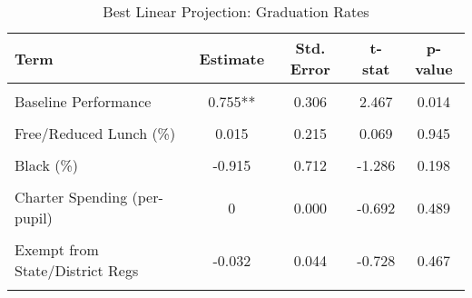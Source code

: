 \begin{table}[!h]
\centering
\caption{\label{tab:blp_afgr}Best Linear Projection: Graduation Rates}
\centering
\begin{tabular}[t]{lcccc}
\toprule
Term & Estimate & Std. Error & t-stat & p-value\\
\midrule
\cellcolor{gray!10}{(Intercept)} & \cellcolor{gray!10}{-1.601**} & \cellcolor{gray!10}{0.642} & \cellcolor{gray!10}{-2.496} & \cellcolor{gray!10}{0.013}\\
Baseline Performance & 0.755** & 0.306 & 2.467 & 0.014\\
\cellcolor{gray!10}{White (\%)} & \cellcolor{gray!10}{-0.245} & \cellcolor{gray!10}{0.314} & \cellcolor{gray!10}{-0.780} & \cellcolor{gray!10}{0.436}\\
Free/Reduced Lunch (\%) & 0.015 & 0.215 & 0.069 & 0.945\\
\cellcolor{gray!10}{TPS-Charter Spending (\% diff)} & \cellcolor{gray!10}{0.099} & \cellcolor{gray!10}{0.356} & \cellcolor{gray!10}{0.279} & \cellcolor{gray!10}{0.781}\\
Black (\%) & -0.915 & 0.712 & -1.286 & 0.198\\
\cellcolor{gray!10}{Special Ed (\%)} & \cellcolor{gray!10}{3.521*} & \cellcolor{gray!10}{1.881} & \cellcolor{gray!10}{1.872} & \cellcolor{gray!10}{0.061}\\
Charter Spending (per-pupil) & 0 & 0.000 & -0.692 & 0.489\\
\cellcolor{gray!10}{Log of Enrollment} & \cellcolor{gray!10}{0.121**} & \cellcolor{gray!10}{0.058} & \cellcolor{gray!10}{2.084} & \cellcolor{gray!10}{0.037}\\
Exempt from State/District Regs & -0.032 & 0.044 & -0.728 & 0.467\\
\cellcolor{gray!10}{Hispanic (\%)} & \cellcolor{gray!10}{0.432} & \cellcolor{gray!10}{0.461} & \cellcolor{gray!10}{0.938} & \cellcolor{gray!10}{0.348}\\
\bottomrule
\end{tabular}
\end{table}
